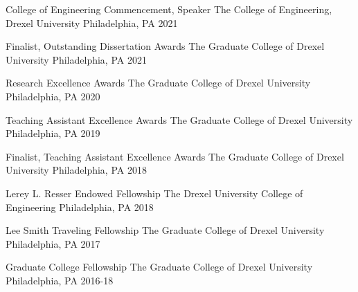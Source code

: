 



\begin{cvhonors}
  \cvhonor
    {College of Engineering Commencement, Speaker} %
    {The College of Engineering, Drexel University} %
    {Philadelphia, PA} %
    {2021} %
    
  \cvhonor
    {Finalist, Outstanding Dissertation Awards} %
    {The Graduate College of Drexel University} %
    {Philadelphia, PA} %
    {2021} %
    
  \cvhonor
    {Research Excellence Awards} %
    {The Graduate College of Drexel University} %
    {Philadelphia, PA} %
    {2020} %
    
  \cvhonor
    {Teaching Assistant Excellence Awards} %
    {The Graduate College of Drexel University} %
    {Philadelphia, PA} %
    {2019} %
    
  \cvhonor
    {Finalist, Teaching Assistant Excellence Awards} %
    {The Graduate College of Drexel University} %
    {Philadelphia, PA} %
    {2018} %

  \cvhonor
    {Lerey L. Resser Endowed Fellowship} %
    {The Drexel University College of Engineering} %
    {Philadelphia, PA} %
    {2018} %

  \cvhonor
    {Lee Smith Traveling Fellowship} %
    {The Graduate College of Drexel University} %
    {Philadelphia, PA} %
    {2017} %

  \cvhonor
    {Graduate College Fellowship} %
    {The Graduate College of Drexel University} %
    {Philadelphia, PA} %
    {2016-18} %



\end{cvhonors}
